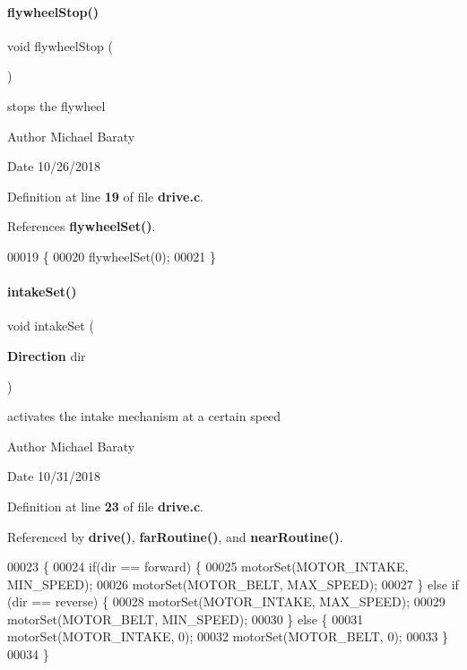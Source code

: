 \paragraph{flywheel\+Stop()}
{\footnotesize\ttfamily void flywheel\+Stop (\begin{DoxyParamCaption}{ }\end{DoxyParamCaption})}



stops the flywheel 

\begin{DoxyAuthor}{Author}
Michael Baraty 
\end{DoxyAuthor}
\begin{DoxyDate}{Date}
10/26/2018 
\end{DoxyDate}


Definition at line \textbf{ 19} of file \textbf{ drive.\+c}.



References \textbf{ flywheel\+Set()}.


\begin{DoxyCode}
00019                     \{
00020   flywheelSet(0);
00021 \}
\end{DoxyCode}
\mbox{\label{drive_8h_a80d5e8b6ad5f4ebc5e22d2c179537aa8}} 
\paragraph{intake\+Set()}
{\footnotesize\ttfamily void intake\+Set (\begin{DoxyParamCaption}\item[{\textbf{ Direction}}]{dir }\end{DoxyParamCaption})}



activates the intake mechanism at a certain speed 

\begin{DoxyAuthor}{Author}
Michael Baraty 
\end{DoxyAuthor}
\begin{DoxyDate}{Date}
10/31/2018 
\end{DoxyDate}


Definition at line \textbf{ 23} of file \textbf{ drive.\+c}.



Referenced by \textbf{ drive()}, \textbf{ far\+Routine()}, and \textbf{ near\+Routine()}.


\begin{DoxyCode}
00023                               \{
00024   \textcolor{keywordflow}{if}(dir == forward) \{
00025     motorSet(MOTOR_INTAKE, MIN_SPEED);
00026     motorSet(MOTOR_BELT, MAX_SPEED);
00027   \} \textcolor{keywordflow}{else} \textcolor{keywordflow}{if} (dir == reverse) \{
00028     motorSet(MOTOR_INTAKE, MAX_SPEED);
00029     motorSet(MOTOR_BELT, MIN_SPEED);
00030   \} \textcolor{keywordflow}{else} \{
00031     motorSet(MOTOR_INTAKE, 0);
00032     motorSet(MOTOR_BELT, 0);
00033   \}
00034 \}
\end{DoxyCode}
\mbox{\label{drive_8h_a62c5f4e08161e15214b78686e675aabb}} 
